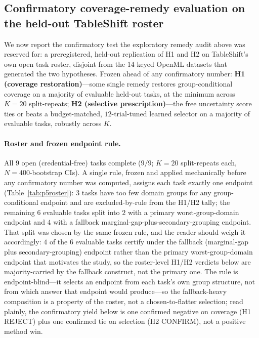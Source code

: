\documentclass[11pt]{article}
\begin{document}
\subsection*{Confirmatory coverage-remedy evaluation on the held-out TableShift roster}
We now report the confirmatory test the exploratory remedy audit above was reserved for: a preregistered,
held-out replication of H1 and H2 on TableShift's own open task roster, disjoint from the 14 keyed OpenML
datasets that generated the two hypotheses. Frozen ahead of any confirmatory number: \textbf{H1 (coverage
restoration)}---some single remedy restores group-conditional coverage on a majority of evaluable held-out
tasks, at the minimum across $K{=}20$ split-repeats; \textbf{H2 (selective prescription)}---the free
uncertainty score ties or beats a budget-matched, $12$-trial-tuned learned selector on a majority of
evaluable tasks, robustly across $K$.

\paragraph{Roster and frozen endpoint rule.} All $9$ open (credential-free) tasks complete ($9/9$;
$K{=}20$ split-repeats each, $N{=}400$-bootstrap CIs). A single rule, frozen and applied mechanically before
any confirmatory number was computed, assigns each task exactly one endpoint (Table~\ref{tab:p5roster}):
$3$ tasks have too few domain groups for any group-conditional endpoint and are excluded-by-rule from the
H1/H2 tally; the remaining $6$ evaluable tasks split into $2$ with a primary worst-group-domain endpoint and
$4$ with a fallback marginal-gap-plus-secondary-grouping endpoint. That split was chosen by the same
frozen rule, and the reader should weigh it accordingly:
$4$ of the $6$ evaluable tasks certify under the fallback (marginal-gap plus secondary-grouping) endpoint
rather than the primary worst-group-domain endpoint that motivates the study, so the roster-level H1/H2
verdicts below are majority-carried by the fallback construct, not the primary one. The rule is
endpoint-blind---it selects an
endpoint from each task's own group structure, not from which answer that endpoint would produce---so the
fallback-heavy composition is a property of the roster, not a chosen-to-flatter selection; read plainly, the
confirmatory yield below is one confirmed negative on coverage (H1 REJECT) plus one confirmed tie on
selection (H2 CONFIRM), not a positive method win.
\end{document}
